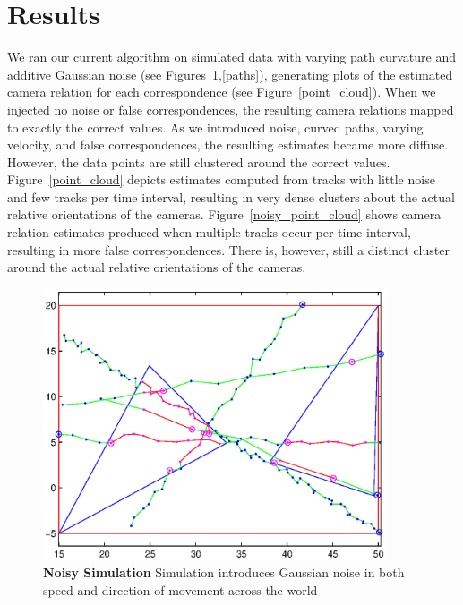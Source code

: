 \documentclass[journal]{IEEEtran}
\begin{document}
\section{Results}
	\indent We ran our current algorithm on simulated data with varying path curvature and additive Gaussian noise (see Figures~\ref{curvy_paths},\ref{paths}), generating plots of the estimated camera relation for each correspondence (see Figure~\ref{point_cloud}). When we injected no noise or false correspondences, the resulting camera relations mapped to exactly the correct values. As we introduced noise, curved paths, varying velocity, and false correspondences, the resulting estimates became more diffuse. However, the data points are still clustered around the correct values. \\
	\indent Figure~\ref{point_cloud} depicts estimates computed from tracks with little noise and few tracks per time interval, resulting in very dense clusters about the actual relative orientations of the cameras. Figure~\ref{noisy_point_cloud} shows camera relation estimates produced when multiple tracks occur per time interval, resulting in more false correspondences. There is, however, still a distinct cluster around the actual relative orientations of the cameras.

	\begin{figure}
		\centering
		\includegraphics[width=4in]{./curvy_paths.eps}
		\caption{\textbf{Noisy Simulation} Simulation introduces Gaussian noise in both 											speed and direction of movement across the 											world}
		\label{curvy_paths}
	\end{figure}
\end{document}
